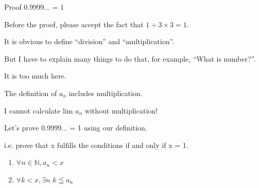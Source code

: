 %
%

\begin{frame}[c]{}{}
  {\large Proof 0.9999... = 1}
\end{frame}

\begin{frame}[c]{}{}
  Before the proof, please accept the fact that $1 \div 3 \times 3 = 1$.
\end{frame}

\begin{frame}[c]{}{}
  It is obvious to define ``division'' and ``multiplication''.

  \vspace{2ex}

  But I have to explain many things to do that, for example, ``What is number?''.

  \vspace{2ex}

  It is too much here.
\end{frame}

\begin{frame}[c]{}{}
  The definition of $a_n$ includes multiplication.

  \vspace{4ex}

  I cannot calculate lim $a_n$ without multiplication!
\end{frame}

\begin{frame}[c]{}{}
  Let's prove 0.9999... = 1 using our definition.

  \vspace{2ex}

  i.e. prove that x fulfills the conditions if and only if x = 1.

  \vspace{2ex}

  \begin{enumerate}
  \item $\forall n \in \mathbb{N}, a_n < x$
  \item $\forall k < x, \exists n$ $k \leqq a_n$
  \end{enumerate}
\end{frame}

